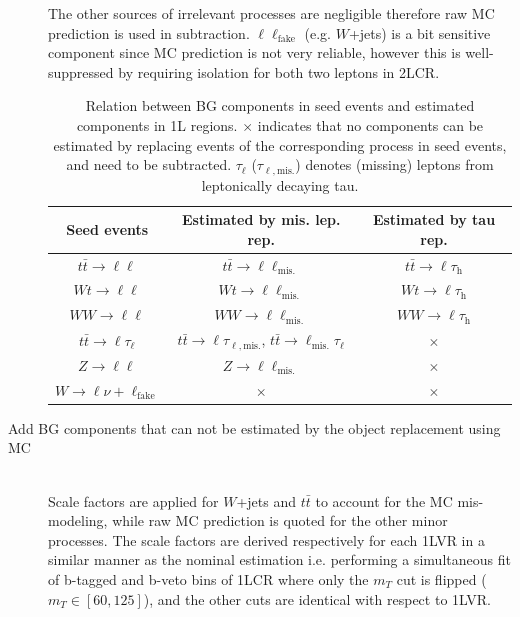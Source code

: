 \begin{description}
The other sources of irrelevant processes are negligible therefore raw MC prediction is used in subtraction. $\ell\ell_{\mathrm{fake}}$ (e.g. $W$+jets) is a bit sensitive component since MC prediction is not very reliable, however this is well-suppressed by requiring isolation for both two leptons in 2LCR. \\

\begin{table}[h]
  \begin{center}
    \caption{Relation between BG components in seed events and estimated components in 1L regions. $\times$ indicates that no components can be estimated by replacing events of the corresponding process in seed events, and need to be subtracted. $\tau_{\ell}$ ($\tau_{\ell, \mathrm{mis.}}$) denotes (missing) leptons from leptonically decaying tau.}

    \begin{tabular}{ | c | c | c | }
      \hline 
      Seed events & Estimated by mis. lep. rep. & Estimated by tau rep.  \\
%
      \hline      
      $t\bar{t}\rightarrow\ell\ell$ & 
      $t\bar{t}\rightarrow\ell\ell_{\mathrm{mis.}}$ &
      $t\bar{t}\rightarrow\ell\tau_{\mathrm{h}}$ \\
%
      \hline      
      $Wt\rightarrow\ell\ell$ & 
      $Wt\rightarrow\ell\ell_{\mathrm{mis.}}$ &
      $Wt\rightarrow\ell\tau_{\mathrm{h}}$ \\
%
      \hline      
      $WW\rightarrow\ell\ell$ & 
      $WW\rightarrow\ell\ell_{\mathrm{mis.}}$ &
      $WW\rightarrow\ell\tau_{\mathrm{h}}$ \\
%
      \hline
      $t\bar{t}\rightarrow\ell\tau_{\ell}$ & 
      $t\bar{t}\rightarrow\ell\tau_{\ell,\mathrm{mis.}}$, $t\bar{t}\rightarrow\ell_{\mathrm{mis.}}\tau_{\ell}$ & 
      $\times$ \\
%
      \hline
      $Z\rightarrow \ell\ell$ & 
      $Z\rightarrow \ell\ell_{\mathrm{mis.}}$ &
      $\times$ \\
%
      \hline
      $W\rightarrow \ell\nu + \ell_{\mathrm{fake}}$ & 
      $\times$ &
      $\times$ \\
      \hline
    \end{tabular}  \label{tab::ObjReplace::dataClosure::BGspecies}
  \end{center}
\end{table}



\item [Add BG components that can not be estimated by the object replacement using MC] \mbox{} \\
Scale factors are applied for $W$+jets and $t\bar{t}$ to account for the MC mis-modeling, while raw MC prediction is quoted for the other minor processes.
The scale factors are derived respectively for each 1LVR in a similar manner as the nominal estimation i.e. performing a simultaneous fit of b-tagged and b-veto bins of 1LCR where only the $m_T$ cut is flipped ($m_T\in[60,125]$), and the other cuts are identical with respect to 1LVR.
\end{description}

